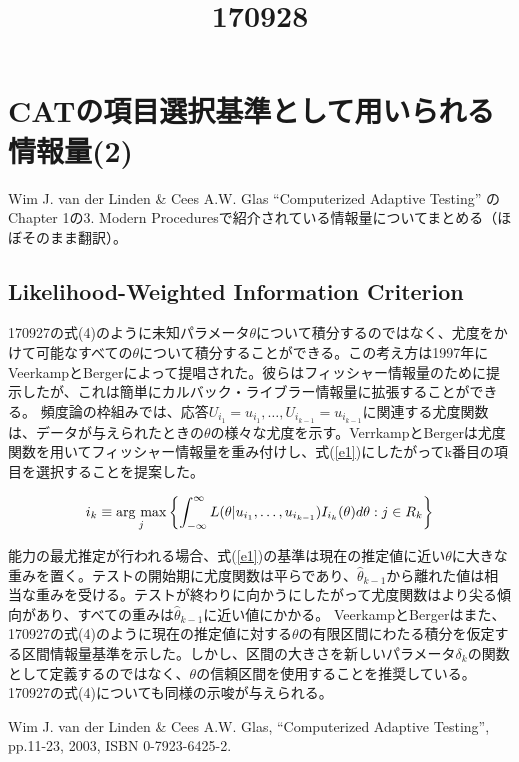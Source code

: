 \documentclass[a4j]{jarticle}
\date{}
\title{170928}
\begin{document}
\maketitle

\section{CATの項目選択基準として用いられる情報量(2)}
Wim J. van der Linden \& Cees A.W. Glas ``Computerized Adaptive Testing'' \cite{b1}のChapter 1の3. Modern Proceduresで紹介されている情報量についてまとめる（ほぼそのまま翻訳）。

\subsection{Likelihood-Weighted Information Criterion}
170927の式(4)のように未知パラメータ$\theta$について積分するのではなく、尤度をかけて可能なすべての$\theta$について積分することができる。この考え方は1997年にVeerkampとBergerによって提唱された。彼らはフィッシャー情報量のために提示したが、これは簡単にカルバック・ライブラー情報量に拡張することができる。
頻度論の枠組みでは、応答$U_{i_{1}}=u_{i_{1}},\ldots,U_{i_{k-1}}=u_{i_{k-1}}$に関連する尤度関数は、データが与えられたときの$\theta$の様々な尤度を示す。VerrkampとBergerは尤度関数を用いてフィッシャー情報量を重み付けし、式(\ref{e1})にしたがってk番目の項目を選択することを提案した。

\newcommand{\argmax}{\mathop{\rm arg~max}\limits}
\begin{eqnarray}
  \label{e1}
  i_{k} \equiv \argmax_{j}\left\{\int_{-\infty}^{\infty}L(\theta|u_{i_{1}},\ldots,u_{i_{k-1}})I_{i_{k}}(\theta)d\theta:j\in R_{k}\right\}
\end{eqnarray}

能力の最尤推定が行われる場合、式(\ref{e1})の基準は現在の推定値に近い$\theta$に大きな重みを置く。テストの開始期に尤度関数は平らであり、$\hat{\theta}_{k-1}$から離れた値は相当な重みを受ける。テストが終わりに向かうにしたがって尤度関数はより尖る傾向があり、すべての重みは$\hat{\theta}_{k-1}$に近い値にかかる。
VeerkampとBergerはまた、170927の式(4)のように現在の推定値に対する$\theta$の有限区間にわたる積分を仮定する区間情報量基準を示した。しかし、区間の大きさを新しいパラメータ$\delta_{k}$の関数として定義するのではなく、$\theta$の信頼区間を使用することを推奨している。170927の式(4)についても同様の示唆が与えられる。

\begin{thebibliography}{9}
   Wim J. van der Linden \& Cees A.W. Glas, ``Computerized Adaptive Testing'', pp.11-23, 2003, ISBN 0-7923-6425-2.
\end{thebibliography}
\end{document}
